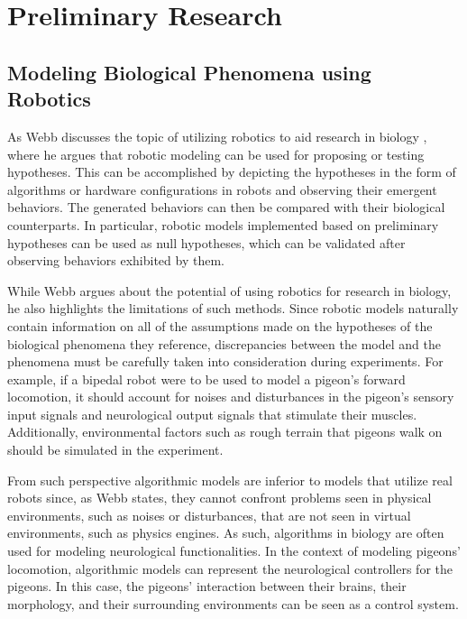 \chapter{Preliminary Research}
\section{Modeling Biological Phenomena using Robotics}
  As Webb discusses the topic of utilizing robotics to aid research in biology \cite{webb2000does}, where he argues that robotic modeling can be used for proposing or testing hypotheses. This can be accomplished by depicting the hypotheses in the form of algorithms or hardware configurations in robots and observing their emergent behaviors. The generated behaviors can then be compared with their biological counterparts. In particular, robotic models implemented based on preliminary hypotheses can be used as null hypotheses, which can be validated after observing behaviors exhibited by them.

    While Webb argues about the potential of using robotics for research in biology, he also highlights the limitations of such methods.
    Since robotic models naturally contain information on all of the assumptions made on the hypotheses of the biological phenomena they reference, discrepancies between the model and the phenomena must be carefully taken into consideration during experiments. For example, if a bipedal robot were to be used to model a pigeon's forward locomotion, it should account for noises and disturbances in the pigeon's sensory input signals and neurological output signals that stimulate their muscles. Additionally, environmental factors such as rough terrain that pigeons walk on should be simulated in the experiment.

    From such perspective algorithmic models are inferior to models that utilize real robots since, as Webb states, they cannot confront problems seen in physical environments, such as noises or disturbances, that are not seen in virtual environments, such as physics engines.
      As such, algorithms in biology are often used for modeling neurological functionalities. In the context of modeling pigeons' locomotion, algorithmic models can represent the neurological controllers for the pigeons. In this case, the pigeons' interaction between their brains, their morphology, and their surrounding environments can be seen as a control system.
%

